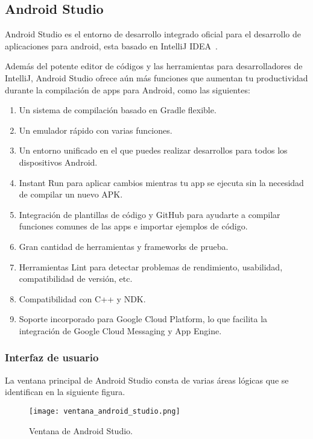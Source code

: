 \subsection{Android Studio}
Android Studio es el entorno de desarrollo integrado oficial para el 
desarrollo de aplicaciones para android, esta basado en IntelliJ IDEA~\cite{INTELLIJ}.

Además del potente editor de códigos y las herramientas 
para desarrolladores de IntelliJ, Android Studio ofrece aún
 más funciones que aumentan tu productividad durante la
 compilación de apps para Android, como las siguientes:

\begin{enumerate}
\item Un sistema de compilación basado en Gradle flexible.
\item Un emulador rápido con varias funciones.
\item Un entorno unificado en el que puedes realizar
 desarrollos para todos los dispositivos Android.
\item Instant Run para aplicar cambios mientras 
tu app se ejecuta sin la necesidad de compilar un nuevo APK.
\item Integración de plantillas de código y GitHub
 para ayudarte a compilar funciones comunes de las
 apps e importar ejemplos de código.
\item Gran cantidad de herramientas y frameworks
 de prueba.
\item Herramientas Lint para detectar problemas de
 rendimiento, usabilidad, compatibilidad de versión, etc.
\item Compatibilidad con C++ y NDK.
\item Soporte incorporado para Google Cloud Platform,
 lo que facilita la integración de Google Cloud Messaging 
y App Engine.
\end{enumerate}
\subsubsection{Interfaz de usuario}
La ventana principal de Android Studio consta 
de varias áreas lógicas que se identifican en la siguiente figura.
\linebreak 
\begin{figure}[h]
\texttt{[image: ventana\_android\_studio.png]} 
\caption{Ventana de Android Studio.}
\end{figure}

